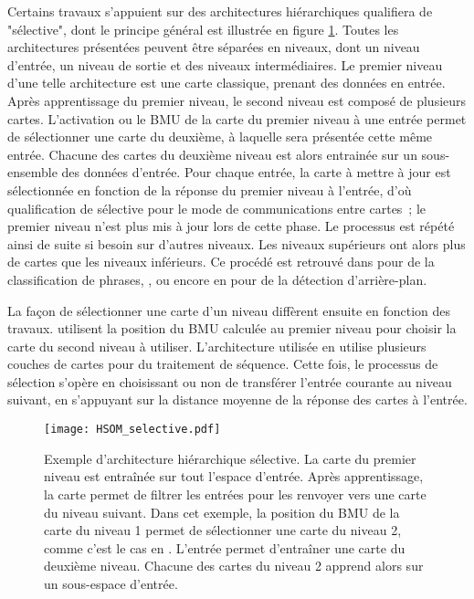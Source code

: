 \documentclass[../main]{subfiles}
\begin{document}
Certains travaux s'appuient sur des architectures hiérarchiques qualifiera de "sélective", dont le principe général est illustrée en figure \ref{fig:hsom_selective}. Toutes les architectures présentées peuvent être séparées en niveaux, dont un niveau d'entrée, un niveau de sortie et des niveaux intermédiaires.
Le premier niveau d'une telle architecture est une carte classique, prenant des données en entrée. 
Après apprentissage du premier niveau, le second niveau est composé de plusieurs cartes.
L'activation ou le BMU de la carte du premier niveau à une entrée permet de sélectionner une carte du deuxième, à laquelle sera présentée cette même entrée. 
Chacune des cartes du deuxième niveau est alors entrainée sur un sous-ensemble des données d'entrée. Pour chaque entrée, la carte à mettre à jour est sélectionnée en fonction de la réponse du premier niveau à l'entrée, d'où
qualification de sélective pour le mode de communications entre cartes~; le premier niveau n'est plus mis à jour lors de cette phase.
Le processus est répété ainsi de suite si besoin sur d'autres niveaux. Les niveaux supérieurs ont alors plus de cartes que les niveaux inférieurs.
Ce procédé est retrouvé dans \cite{barbalho_hierarchical_2001,suganthan_pattern_2001}
\cite{miikkulainen_script_1992} pour de la classification de phrases, \cite{dittenbach_growing_2000,ordonez_hierarchical_2010}, ou encore en \cite{zhao_stacked_2015} pour de la détection d'arrière-plan.

La façon de sélectionner une carte d'un niveau diffèrent ensuite en fonction des travaux.
\cite{barbalho_hierarchical_2001} utilisent la position du BMU calculée au premier niveau pour choisir la carte du second niveau à utiliser. L'architecture utilisée en \cite{zhao_stacked_2015} utilise plusieurs couches de cartes pour du traitement de séquence. Cette fois, le processus de sélection s'opère en choisissant ou non de transférer l'entrée courante au niveau suivant, en s'appuyant sur la distance moyenne de la réponse des cartes à l'entrée.

\begin{figure}
    \texttt{[image: HSOM\_selective.pdf]}
    \caption{Exemple d'architecture hiérarchique sélective. La carte du premier niveau est entraînée sur tout l'espace d'entrée. Après apprentissage, la carte permet de filtrer les entrées pour les renvoyer vers une carte du niveau suivant. Dans cet exemple, la position du BMU de la carte du niveau 1 permet de sélectionner une carte du niveau 2, comme c'est le cas en \cite{barbalho_hierarchical_2001}. 
    L'entrée permet d'entraîner une carte du deuxième niveau. Chacune des cartes du niveau 2 apprend alors sur un sous-espace d'entrée.\label{fig:hsom_selective}}
\end{figure}
\end{document}
